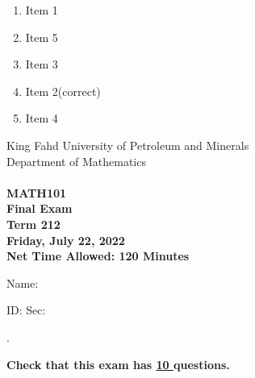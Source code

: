 \documentclass[amsfonts,bezier,leqno,fleqn,12pt,a4paper]{article}
\begin{document}
{{{\begin{large}
\begin{enumerate}
\begin{enumerate}
\item  Item 1
\item  Item 5
\item  Item 3
\item  Item 2\hfill {\small (correct)}
\item  Item 4

\end{enumerate}
\newpage


\end{enumerate}
\end{large}


\newpage


\thispagestyle{empty}
\begin{center}
    \begin{large}
        King Fahd University of Petroleum and Minerals \\ 
        Department of Mathematics  \\ 
        \vspace*{4.5cm}
        {\bf {} }  \hfill {\bf {}} \\
        {\bf MATH101 }  \\
        {\bf Final Exam }  \\
        {\bf Term 212 }  \\
        {\bf Friday, July 22, 2022 }  \\ 
        {\bf Net Time Allowed: 120 Minutes }  \\
        \vspace*{0.2cm}

    \end{large}
\end{center}

\large{Name:  }\hrulefill

\vspace{3mm}

\large{ID: } \hrulefill \large{  Sec: } \hrulefill \large{.

\vspace{1cm}

\large{\bf{Check that this exam has {\underline{ 10 }} questions.}}

\vspace{1cm}

}}}}
\end{document}
